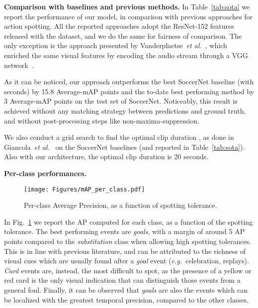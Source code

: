 \documentclass[a4paper,conference]{IEEEtran}
\newcommand{\tit}[1]{\smallbreak\noindent\textbf{#1.}}
\def \eg {\emph{e.g.}}
\def \etal {\emph{et al.}}
\begin{document}
\tit{Comparison with baselines and previous methods}
In Table~\ref{tab:sota} we report the performance of our model, in comparison with previous approaches for action spotting. All the reported approaches adopt the ResNet-152 features released with the dataset, and we do the same for fairness of comparison. The only exception is the approach presented by Vanderplaetse~\etal~\cite{vanderplaetse2020improved}, which enriched the same visual features by encoding the audio stream through a VGG network~\cite{simonyan2014very}.

As it can be noticed, our approach outperforms the best SoccerNet baseline (with  seconds) by 15.8 Average-mAP points and the to-date best performing method by 3 Average-mAP points on the test set of SoccerNet. Noticeably, this result is achieved without any matching strategy between predictions and ground truth, and without post-processing steps like non-maxima-suppression. 

We also conduct a grid search to find the optimal clip duration , as done in Giancola~\etal~\cite{giancola2018soccernet} on the SoccerNet baselines (and reported in Table~\ref{tab:sota}). Also with our architecture, the optimal clip duration is 20 seconds.

\tit{Per-class performances}
\begin{figure}[t]
\centering
\texttt{[image: Figures/mAP\_per\_class.pdf]}
\caption{Per-class Average Precision, as a function of spotting tolerance.}
\label{fig:mAP_per_class}
\end{figure}
In Fig.~\ref{fig:mAP_per_class} we report the AP computed for each class, as a function of the spotting tolerance. The best performing events are \textit{goals}, with a margin of around 5 AP points compared to the \textit{substitution} class when allowing high spotting tolerances. This is in line with previous literature, and can be attributed to the richness of visual cues which are usually found after a \textit{goal} event (\eg~celebration, replays). \textit{Card} events are, instead, the most difficult to spot, as the presence of a yellow or red card is the only visual indication that can distinguish those events from a general foul. Finally, it can be observed that \textit{goals} are also the events which can be localized with the greatest temporal precision, compared to the other classes.
\end{document}
